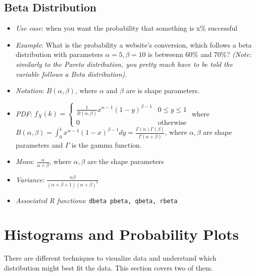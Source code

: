 \documentclass[12pt]{article}
\begin{document}
\subsection{Beta Distribution}

\begin{itemize}
	\item \textit{Use case}: when you want the probability that something is
	      x\% successful
	\item \textit{Example}: What is the probability a website's conversion,
	      which follows a beta distribution with parameters $\alpha = 5, \beta =
		      10$ is betweenn 60\% and 70\%? \emph{(Note:
		      similarly to the Pareto distribution, you pretty much have to be
		      told the variable follows a Beta distribution)}.
	\item \textit{Notation}: $B(\alpha, \beta)$, where $\alpha$ and $\beta$ are
	      is shape parameters.
	\item \textit{PDF}: $f_X(k) = \begin{cases}
			      \frac{1}{B(\alpha, \beta)} x^{\alpha - 1}(1-y)^{\beta - 1} & 0 \leq y \leq 1  \\
			      0                                                          & \text{otherwise}
		      \end{cases}$ where $B(\alpha, \beta) = \int_{0}^{1} x^{\alpha -
				      1}(1 - x)^{\beta - 1}dy =
		      \frac{\Gamma(\alpha)\Gamma(\beta)}{\Gamma(\alpha + \beta)}$,
	      where $\alpha, \beta$ are shape parameters and $\Gamma$ is the
	      gamma function.
	\item \textit{Mean}: $\frac{\alpha}{\alpha + \beta}$, where $\alpha, \beta$ are the shape parameters
	\item \textit{Variance}: $\frac{\alpha\beta}{(\alpha + \beta + 1)(\alpha + \beta)^2}$
	\item \textit{Associated R functions}: \verb|dbeta pbeta, qbeta, rbeta|
\end{itemize}


\section{Histograms and Probability Plots}

There are different techniques to visualize data and understand which distribution might best fit the data. This section covers two of them.
\end{document}
